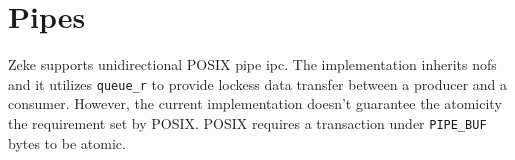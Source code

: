 \chapter{Pipes}

Zeke supports unidirectional \ac{POSIX} pipe \ac{ipc}. The implementation
inherits nofs and it utilizes \verb+queue_r+ to provide lockess data transfer
between a producer and a consumer. However, the current implementation
doesn't guarantee the atomicity the requirement set by \ac{POSIX}. POSIX
requires a transaction under \verb+PIPE_BUF+ bytes to be atomic.
